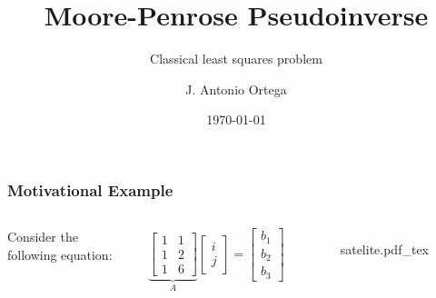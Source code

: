 \documentclass[aspectratio=169]{beamer}
\title[Penrose Pseudoinverse]{Moore-Penrose Pseudoinverse}
\subtitle{Classical least squares problem}
\author{J. Antonio Ortega}
\institute{UNAM}
\date{\today}
\newcommand{\incfig}[2][1]{%
    \def\svgwidth{#1\columnwidth}
    {#2.pdf_tex} }
\begin{document}

\frame{\titlepage}


\begin{frame} %
	\frametitle{Motivational Example}  %
	\begin{columns}


	Consider the following equation:

	\begin{equation*}
		\underbrace{\begin{bmatrix} 1 & 1 \\ 1 & 2 \\ 1 & 6 \end{bmatrix}}_A \begin{bmatrix} i \\ j  \end{bmatrix} = \begin{bmatrix} b_1 \\ b_2 \\ b_3\end{bmatrix}
	\end{equation*}

	\vspace*{10mm}
	

	\begin{figure}[ht]
    		\centering
	    \incfig{satelite}
	    \label{fig:satelite}
	\end{figure}
	\end{columns}


\end{frame}
\end{document}
